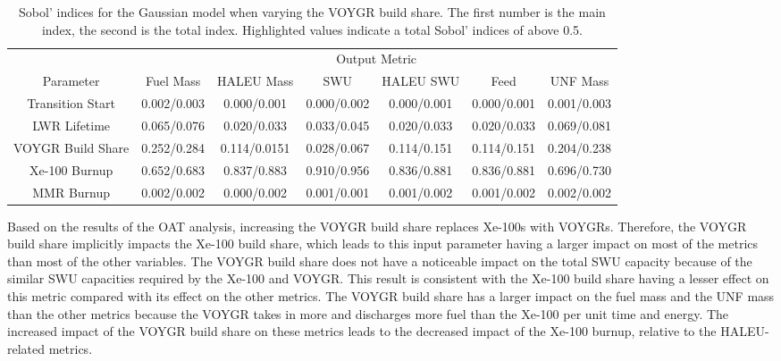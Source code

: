 \begin{table}[h!]
    \centering
    \caption{Sobol' indices for the Gaussian model when varying the VOYGR 
    build share. The first number is the main index, the second is the total 
    index. Highlighted 
    values indicate a total Sobol' indices of above 0.5.}
    \label{tab:s7_sobol_voygr_gaussian}
    \begin{tabular}{c c c c c c c}
        \hline
        & \multicolumn{6}{c}{Output Metric} \\
        Parameter & Fuel Mass & HALEU Mass & SWU & HALEU SWU & Feed & UNF Mass \\
        \hline
        Transition Start & 0.002/0.003 & 0.000/0.001 & 0.000/0.002 & 
                           0.000/0.001 & 0.000/0.001 & 0.001/0.003\\
        LWR Lifetime & 0.065/0.076 & 0.020/0.033 & 0.033/0.045 & 
                       0.020/0.033 & 0.020/0.033 & 0.069/0.081\\
        VOYGR Build Share & 0.252/0.284 & 0.114/0.0151 & 0.028/0.067 &
                            0.114/0.151 & 0.114/0.151 & 0.204/0.238\\
        Xe-100 Burnup & \cellcolor{green!25}0.652/0.683 & \cellcolor{green!25}0.837/0.883 & \cellcolor{green!25}0.910/0.956 & 
        \cellcolor{green!25}0.836/0.881 & \cellcolor{green!25}0.836/0.881 & \cellcolor{green!25}0.696/0.730\\
        MMR Burnup & 0.002/0.002 & 0.000/0.002 & 0.001/0.001 & 
                     0.001/0.002 & 0.001/0.002 & 0.002/0.002\\
        \hline        
    \end{tabular}
\end{table}

Based on the results of the \gls{OAT} analysis, increasing the VOYGR build 
share replaces 
Xe-100s with VOYGRs. Therefore, the VOYGR build share implicitly 
impacts the Xe-100 build share, which leads to this input parameter 
having a larger impact on most of the metrics than most of the other variables. 
The VOYGR build share does not have a noticeable impact on the 
total \gls{SWU} capacity because of the similar \gls{SWU} capacities 
required by the Xe-100 and VOYGR. This result is consistent with the 
Xe-100 build share having a lesser effect on this metric compared 
with its effect on the other metrics. 
The VOYGR build share has a larger impact on the fuel mass and the 
\gls{UNF} mass than the other metrics because the VOYGR takes in more 
and discharges more fuel than the Xe-100 per unit time and energy. 
The 
increased impact of the VOYGR build share on these metrics leads to 
the decreased impact of the Xe-100 burnup, relative to the 
\gls{HALEU}-related metrics. 


